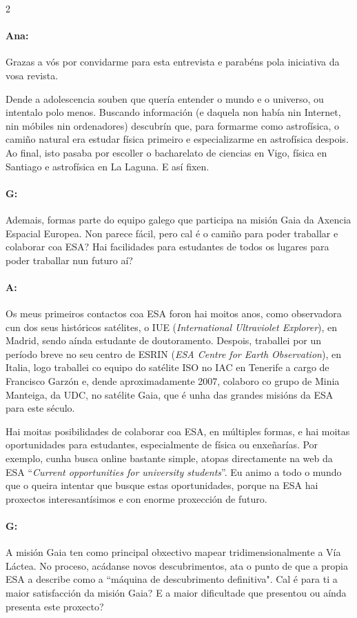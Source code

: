 \begin{refsection}
\begin{multicols}{2}
\paragraph{Ana:} Grazas a vós por convidarme para esta entrevista e parabéns pola
iniciativa da vosa revista.

Dende a adolescencia souben que quería entender o mundo e o universo, ou
intentalo polo menos. Buscando información (e daquela non había nin Internet,
nin móbiles nin ordenadores) descubrín que, para formarme como astrofísica, o
camiño natural era estudar física primeiro e especializarme en astrofísica
despois. Ao final, isto pasaba por escoller o bacharelato de ciencias en Vigo,
física en Santiago e astrofísica en La Laguna. E así fixen.

\paragraph{G:} Ademais, formas parte do equipo galego que participa na misión Gaia
da Axencia Espacial Europea. Non parece fácil, pero cal é o camiño para poder
traballar e colaborar coa ESA? Hai facilidades para estudantes de todos os
lugares para poder traballar nun futuro aí?

\paragraph{A:} Os meus primeiros contactos coa ESA foron hai moitos anos, como
observadora cun dos seus históricos satélites, o IUE (\textit{International
Ultraviolet Explorer}), en Madrid, sendo aínda estudante de doutoramento.
Despois, traballei por un período breve no seu centro de ESRIN (\textit{ESA
Centre for Earth Observation}), en Italia, logo traballei co equipo do satélite
ISO no IAC en Tenerife a cargo de Francisco Garzón e, dende aproximadamente
2007, colaboro co grupo de Minia Manteiga, da UDC, no satélite Gaia, que é unha
das grandes misións da ESA para este século.

Hai moitas posibilidades de colaborar coa ESA, en múltiples formas, e hai
moitas oportunidades para estudantes, especialmente de física ou enxeñarías.
Por exemplo, cunha busca online bastante simple, atopas directamente na web da
ESA  “\textit{Current opportunities for university students}”. Eu animo a todo
o mundo que o queira intentar que busque estas oportunidades, porque na ESA hai
proxectos interesantísimos e con enorme proxección de futuro.

\paragraph{G:} A misión Gaia ten como principal obxectivo mapear
tridimensionalmente a Vía Láctea. No proceso, acádanse novos descubrimentos,
ata o punto de que a propia ESA a describe como a ``máquina de descubrimento
definitiva". Cal é para ti a maior satisfacción da misión Gaia? E a maior
dificultade que presentou ou aínda presenta este proxecto?


\end{multicols}
\end{refsection}
